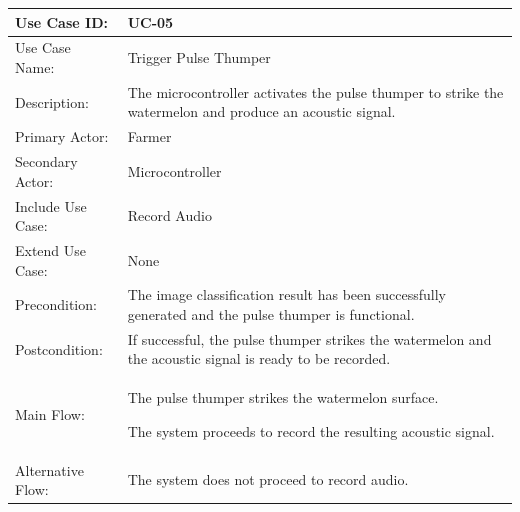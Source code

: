 \begin{thesisprose}
\FloatBarrier
\begingroup
\small
\setlength{\tabcolsep}{3pt}
\renewcommand{\arraystretch}{1.14}
\setlength{\arrayrulewidth}{0.625pt}
\def\LTcaptype{uncaptionedgrid}
\begin{longtable}{|>{\raggedright\arraybackslash}p{}|>{\raggedright\arraybackslash}p{}|}
\hline
Use Case ID: & UC-05 \\
\hline
Use Case Name: & Trigger Pulse Thumper \\
\hline
Description: & The microcontroller activates the pulse thumper to strike the watermelon and produce an acoustic signal. \\
\hline
Primary Actor: & Farmer \\
\hline
Secondary Actor: & Microcontroller \\
\hline
Include Use Case: & Record Audio \\
\hline
Extend Use Case: & None \\
\hline
Precondition: & The image classification result has been successfully generated and the pulse thumper is functional. \\
\hline
Postcondition: & If successful, the pulse thumper strikes the watermelon and the acoustic signal is ready to be recorded. \\
\hline
Main Flow: & The pulse thumper strikes the watermelon surface.\par The system proceeds to record the resulting acoustic signal. \\
\hline
Alternative Flow: & The system does not proceed to record audio. \\
\hline
\end{longtable}
\endgroup


\end{thesisprose}
